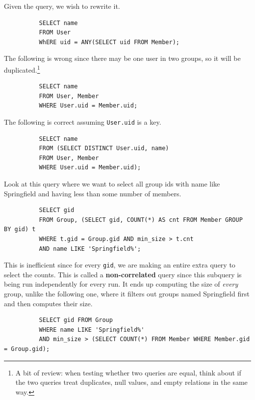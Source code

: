 \documentclass{article}
\begin{document}
      \begin{example}
        Given the query, we wish to rewrite it. 
        \begin{lstlisting}
          SELECT name 
          FROM User 
          WhERE uid = ANY(SELECT uid FROM Member);
        \end{lstlisting}

        The following is wrong since there may be one user in two groups, so it will be duplicated.\footnote{A bit of review: when testing whether two queries are equal, think about if the two queries treat duplicates, null values, and empty relations in the same way. } 
        \begin{lstlisting}
          SELECT name 
          FROM User, Member 
          WHERE User.uid = Member.uid;
        \end{lstlisting} 

        The following is correct assuming \texttt{User.uid} is a key. 
        \begin{lstlisting}
          SELECT name 
          FROM (SELECT DISTINCT User.uid, name) 
          FROM User, Member 
          WHERE User.uid = Member.uid); 
        \end{lstlisting}
      \end{example}

      \begin{example}
        Look at this query where we want to select all group ids with name like Springfield and having less than some number of members. 
        \begin{lstlisting}
          SELECT gid 
          FROM Group, (SELECT gid, COUNT(*) AS cnt FROM Member GROUP BY gid) t 
          WHERE t.gid = Group.gid AND min_size > t.cnt 
          AND name LIKE 'Springfield%';
        \end{lstlisting}
        This is inefficient since for every \texttt{gid}, we are making an entire extra query to select the counts. This is called a \textbf{non-correlated} query since this subquery is being run independently for every run. It ends up computing the size of \textit{every} group, unlike the following one, where it filters out groups named Springfield first and then computes their size. 
        \begin{lstlisting}
          SELECT gid FROM Group 
          WHERE name LIKE 'Springfield%' 
          AND min_size > (SELECT COUNT(*) FROM Member WHERE Member.gid = Group.gid);
        \end{lstlisting}
      \end{example}
\end{document}
